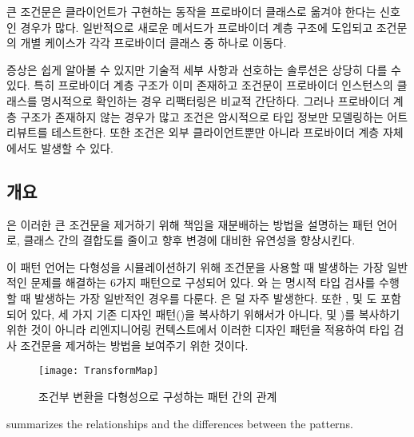 \documentclass[a4paper,10pt,twoside]{book}
\begin{document}
큰 조건문은 클라이언트가 구현하는 동작을 프로바이더 클래스로 옮겨야 한다는 신호인 경우가 많다. 일반적으로 새로운 메서드가 프로바이더 계층 구조에 도입되고 조건문의 개별 케이스가 각각 프로바이더 클래스 중 하나로 이동다.

증상은 쉽게 알아볼 수 있지만 기술적 세부 사항과 선호하는 솔루션은 상당히 다를 수 있다. 특히 프로바이더 계층 구조가 이미 존재하고 조건문이 프로바이더 인스턴스의 클래스를 명시적으로 확인하는 경우 리팩터링은 비교적 간단하다. 그러나 프로바이더 계층 구조가 존재하지 않는 경우가 많고 조건은 암시적으로 타입 정보만 모델링하는 어트리뷰트를 테스트한다. 또한 조건은 외부 클라이언트뿐만 아니라 프로바이더 계층 자체에서도 발생할 수 있다. 

\subsection*{개요}

은 이러한 큰 조건문을 제거하기 위해 책임을 재분배하는 방법을 설명하는 패턴 언어로, 클래스 간의 결합도를 줄이고 향후 변경에 대비한 유연성을 향상시킨다. 

이 패턴 언어는 다형성을 시뮬레이션하기 위해 조건문을 사용할 때 발생하는 가장 일반적인 문제를 해결하는 6가지 패턴으로 구성되어 있다. 와 는 명시적 타입 검사를 수행할 때 발생하는 가장 일반적인 경우를 다룬다. 은 덜 자주 발생한다. 또한 ,  및 도 포함되어 있다, 세 가지 기존 디자인 패턴()을 복사하기 위해서가 아니다,  및 )를 복사하기 위한 것이 아니라 리엔지니어링 컨텍스트에서 이러한 디자인 패턴을 적용하여 타입 검사 조건문을 제거하는 방법을 보여주기 위한 것이다.

\begin{figure}
\begin{center}
\texttt{[image: TransformMap]}
\caption{조건부 변환을 다형성으로 구성하는 패턴 간의 관계}
\end{center}
\end{figure}

 summarizes the relationships and the differences between the patterns.
\end{document}
